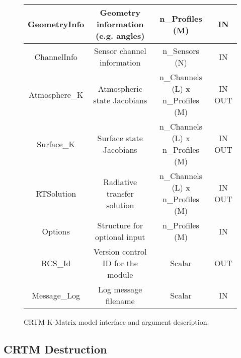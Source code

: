 \begin{figure}[htp]
{\begin{minipage}[b]{6.5in}
\begin{tabular}{c|c|c|c}
      \hline
      GeometryInfo       & Geometry information (e.g. angles)     & n\_Profiles (M)  & IN      \\
      \hline
      ChannelInfo        & Sensor channel information             & n\_Sensors (N)   & IN      \\
      \hline
      Atmosphere\_K      & Atmospheric state Jacobians            & n\_Channels (L) x n\_Profiles (M) & IN OUT  \\
      \hline
      Surface\_K         & Surface state Jacobians                & n\_Channels (L) x n\_Profiles (M) & IN OUT  \\
      \hline
      RTSolution         & Radiative transfer solution            & n\_Channels (L) x n\_Profiles (M) & IN OUT      \\
      \hline
      Options            & Structure for optional input           & n\_Profiles (M)  & IN      \\
      \hline
      RCS\_Id            & Version control ID for the module      & Scalar           & OUT     \\
      \hline
      Message\_Log       & Log message filename                   & Scalar           & IN      \\
    \end{tabular}
  \end{minipage}
  }
  \caption{CRTM K-Matrix model interface and argument description.}
  \label{fig:k_interface}
\end{figure}


\subsection{CRTM Destruction}

